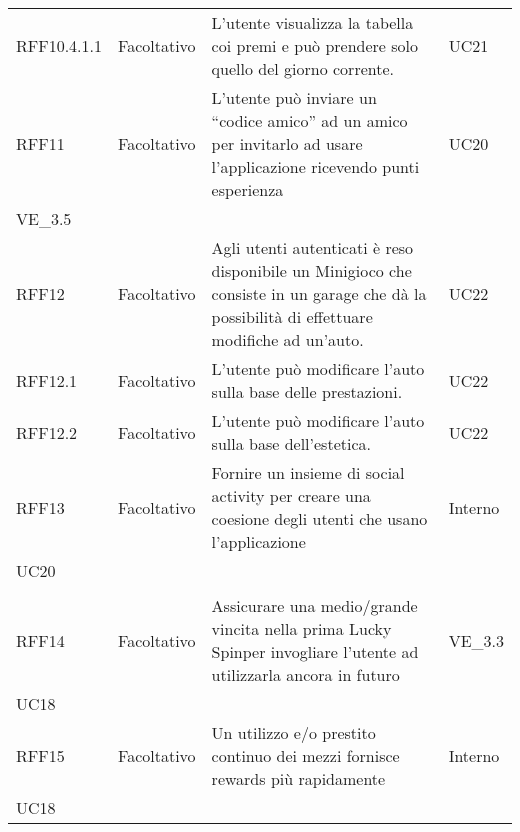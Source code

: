\begin{longtable}{ >{\centering}p{} >{\centering}p{}
		>{\raggedright}p{} >{\centering}p{}}
	RFF10.4.1.1 & Facoltativo & L'utente visualizza la tabella coi premi e può prendere solo quello del giorno corrente. & UC21
	\tabularnewline
	RFF11 & Facoltativo & L'utente può inviare un “codice amico” ad un amico per invitarlo ad usare l'applicazione ricevendo punti esperienza & UC20 \\ VE\_3.5
	\tabularnewline
	RFF12 & Facoltativo & Agli utenti autenticati è reso disponibile un Minigioco che consiste in un garage che dà la possibilità di effettuare modifiche ad un'auto. & UC22 
	\tabularnewline
	RFF12.1 & Facoltativo & L'utente può modificare l'auto sulla base delle prestazioni. & UC22
	\tabularnewline
	RFF12.2 & Facoltativo & L'utente può modificare l'auto sulla base dell'estetica. & UC22
	\tabularnewline
	RFF13	&	Facoltativo	&	Fornire un insieme di social activity per creare una coesione degli utenti che usano l'applicazione &	Interno\\
	UC20\\ 	\tabularnewline
	RFF14	&	Facoltativo	& Assicurare una medio/grande vincita nella prima Lucky Spin\glosp per invogliare l'utente ad utilizzarla ancora in futuro &	VE\_3.3\\
	UC18   	\tabularnewline
	RFF15	&	Facoltativo	& Un utilizzo e/o prestito continuo dei mezzi fornisce rewards più rapidamente &	Interno\\UC18
\end{longtable}

